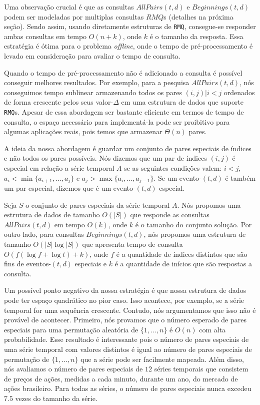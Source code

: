 \documentclass[12pt]{article}
\begin{document}
Uma observação crucial é que as consultas $AllPairs(t,d)$ e $Beginnings(t,d)$ podem
ser modeladas por multiplas consultas $RMQ$s (detalhes na próxima seção). 
Sendo assim, usando diretamente estruturas de {\tt RMQ}, consegue-se responder ambas consultas
em tempo $O(n + k)$, onde $k$ é o tamanho da resposta. Essa estratégia é ótima para
o problema \textit{offline}, onde o tempo de pré-processamento é levado em consideração
para avaliar o tempo de consulta.

Quando o tempo de pré-processamento não é adicionado a consulta é possível conseguir
melhores resultados. Por exemplo, para a pesquisa $AllPairs(t,d)$, nós conseguimos
tempo sublinear armazenando todos os pares ${(i,j)| i < j}$ ordenados de forma crescente
pelos seus valor-$\Delta$ em uma estrutura de dados que suporte {\tt RMQ}s. Apesar 
de essa abordagem ser bastante eficiente em termos de tempo de consulta, o espaço
necessário para implementá-la pode ser proibitivo para algumas aplicações reais, pois
temos que armazenar $\Theta(n)$ pares.

A ideia da nossa abordagem é guardar um conjunto de pares especiais de índices
e não todos os pares possíveis. Nós dizemos que um par de índices $(i,j)$ é
especial em relação a série temporal $A$ se as seguintes condições valem:
$i < j$, $a_i < \min\{a_{i+1}, \ldots, a_j\}$ e $a_j > \max\{a_i, \ldots, a_{j-1}\}$. 
Se um evento-$(t, d)$ é também um par especial, dizemos que é um evento-$(t, d)$ especial.

Seja $S$ o conjunto de pares especiais da série temporal $A$. Nós propomos uma estrutura
de dados de tamanho $O(|S|)$ que responde as consultas $AllPairs(t,d)$ em tempo $O(k)$,
onde $k$ é o tamanho do conjunto solução. Por outro lado, para consultas $Beginnings(t,d)$,
nós propomos uma estrutura de tamanho $O(|S|\log|S|)$ que apresenta tempo de consulta $O(f(\log f + \log t) + k)$,
onde $f$ é a quantidade de índices distintos que são fins de eventos-$(t, d)$ especiais e $k$ 
é a quantidade de inícios que são respostas a consulta.

Um possível ponto negativo da nossa estratégia é que nossa estrutura de dados pode
ter espaço quadrático no pior caso. Isso acontece, por exemplo, se a série temporal
for uma sequência crescente. Contudo, nós argumentamos que isso não é provável de acontecer.
Primeiro, nós provamos que o número esperado de pares especiais para uma permutação aleatória
de $\{1, \ldots, n\}$ é $O(n)$ com alta probabilidade. Esse resultado é interessante pois o número
de pares especiais de uma série temporal com valores distintos é igual ao número de pares 
especiais de permutação de $\{1, \ldots, n\}$ que a série pode ser facilmente mapeada. Além disso,
nós avaliamos o número de pares especiais de $12$ séries temporais que consistem de preços de ações,
medidas a cada minuto, durante um ano, do mercado de ações brasileiro. Para todas as séries, 
o número de pares especiais nunca excedeu $7.5$ vezes do tamanho da série. 
\end{document}
